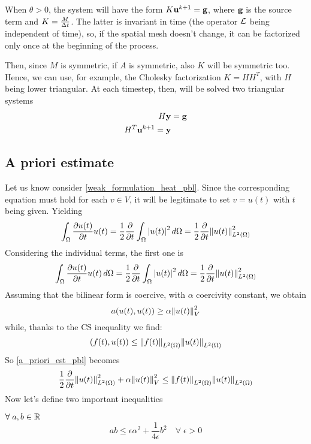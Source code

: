 When \(\theta > 0\), the system will have the form \(K\textbf{u}^{k+1} = \textbf{g}\), where \(\textbf{g}\) is the source term and \(K = \frac{M}{\Delta t}\). The latter is invariant in time (the operator \(\mathcal{L}\) being independent of time), so, if the spatial mesh doesn't change, it can be factorized only once at the beginning of the process. 

Then, since \(M\) is symmetric, if \(A\) is symmetric, also \(K\) will be symmetric too. Hence, we can use, for example, the Cholesky factorization \(K = HH^T\), with \(H\) being lower triangular. At each timestep, then, will be solved two triangular systems 
\begin{align*}
    H\textbf{y} &= \textbf{g} \\
    H^T \textbf{u}^{k+1} = \textbf{y}
\end{align*}
\subsection{A priori estimate}
Let us know consider \eqref{weak_formulation_heat_pbl}. Since the corresponding equation must hold for each \(v \in V\), it will be legitimate to set \(v = u(t)\) with \(t\) being given. Yielding 
\begin{equation}
    \int_\Omega \partialderivative{u(t)}{t} u(t) = \frac{1}{2}\partialderivative{\null}{t} \int_\Omega \abs{u(t)}^2 \, d\Omega = \frac{1}{2} \partialderivative{\null}{t} \ltwonorm{u(t)}^2
    \label{a_priori_est_pbl}
\end{equation}
Considering the individual terms, the first one is 
\begin{equation}
    \int_\Omega \partialderivative{u(t)}{t} u(t) \, d\Omega = \onehalf \partialderivative{\null}{t} \int_\Omega \abs{u(t)}^2 \, d\Omega = \onehalf \partialderivative{\null}{t} \ltwonorm{u(t)}^2
    \label{first_term_est_pbl}
\end{equation}
Assuming that the bilinear form is coercive, with \(\alpha\) coercivity constant, we obtain 
\[
    a(u(t), u(t)) \geq \alpha \norm{u(t)}^2_V
\]
while, thanks to the CS inequality we find:
\begin{equation}
    (f(t), u(t)) \leq \norm{f(t)}_{L^2(\Omega)}\norm{u(t)}_{L^2(\Omega)}
    \label{CS_inequality_pbl}
\end{equation}
So \eqref{a_priori_est_pbl} becomes 
\[
    \frac{1}{2} \partialderivative{\null}{t} \ltwonorm{u(t)}^2 + \alpha \norm{u(t)}_V^2 \leq \ltwonorm{f(t)}\ltwonorm{u(t)}
\] 
Now let's define two important inequalities 
\begin{definition}
    \(\forall \; a, b \in \mathbb{R}\)
    \begin{equation}
        ab \leq \epsilon\alpha^2 + \frac{1}{4\epsilon} b^2 \quad \forall \; \epsilon >0 \label{young_inequality_pbl}
    \end{equation}
\end{definition}
